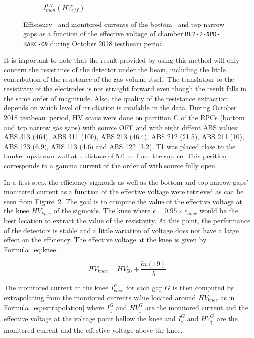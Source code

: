 \begin{figure}[H]
\begin{subfigure}{0.5\linewidth}
        	\caption{\label{fig:october-sig:C} $I_{mon}^{TN}(HV_{eff})$}
    	\end{subfigure}
		\caption{\label{fig:october-sig} Efficiency~ and monitored currents of the bottom~ and top narrow~ gaps as a function of the effective voltage of chamber \texttt{RE2-2-NPD-BARC-09} during October 2018 testbeam period.}
	\end{figure}
	
	It is important to note that the result provided by using this method will only concern the resistance of the detector under the beam, including the little contribution of the resistance of the gas volume itself. The translation to the resistivity of the electrodes is not straight forward even though the result falls in the same order of magnitude. Also, the quality of the resistance extraction depends on which level of irradiation is available in the data. During October 2018 testbeam period, HV scans were done on partition C of the RPCs (bottom and top narrow gas gaps) with source OFF and with eight diffent ABS values: ABS 313 (464), ABS 311 (100), ABS 213 (46.4), ABS 212 (21.5), ABS 211 (10), ABS 123 (6.9), ABS 113 (4.6) and ABS 122 (3.2). T1 was placed close to the bunker upstream wall at a distace of \SI{5.6}{m} from the source. This position corresponds to a gamma current of the order of \siflux with source fully open.
	
	In a first step, the efficiency sigmoids as well as the bottom and top narrow gaps' monitored current as a function of the effective voltage were retrieved as can be seen from Figure~\ref{fig:october-sig}. The goal is to compute the value of the effective voltage at the knee $HV_{knee}$ of the sigmoids. The knee where $\epsilon = 0.95 \times \epsilon_{max}$ would be the best location to extract the value of the resistivity. At this point, the performance of the detectors is stable and a little variation of voltage does not have a large effect on the efficiency. The effective voltage at the knee is given by Formula~\ref{eq:knee}.
	
	\begin{equation}
	\label{eq:knee}
	HV_{knee} = HV_{50} + \frac{ln(19)}{\lambda}
	\end{equation}
	
	The monitored current at the knee $I_{knee}^{G}$ for each gap $G$ is then computed by extrapolating from the monitored currents value located around $HV_{knee}$ as in Formula~\ref{eq:extrapolation} where $I_{\downarrow}^{G}$ and $HV_{\downarrow}^{G}$ are the monitored current and the effective voltage at the voltage point bellow the knee and $I_{\uparrow}^{G}$ and $HV_{\uparrow}^{G}$ are the monitored current and the effective voltage above the knee.
	
